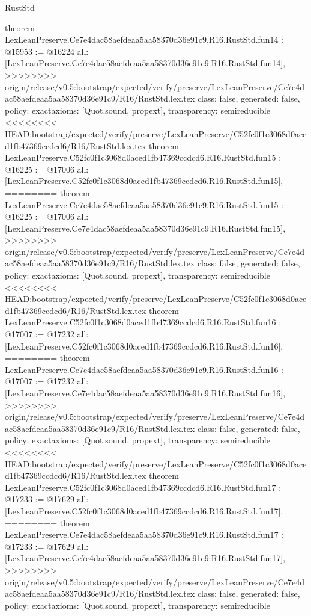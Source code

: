 \begin{lexlean}{RustStd}
\begin{coremodule}
{\begin{coremodule}
{{{{{{{{{{{{{{{{{theorem LexLeanPreserve.Ce7e4dac58aefdeaa5aa58370d36e91c9.R16.RustStd.fun14 : @15953 := @16224 {
  all: [LexLeanPreserve.Ce7e4dac58aefdeaa5aa58370d36e91c9.R16.RustStd.fun14],
>>>>>>>> origin/release/v0.5:bootstrap/expected/verify/preserve/LexLeanPreserve/Ce7e4dac58aefdeaa5aa58370d36e91c9/R16/RustStd.lex.tex
  class: false,
  generated: false,
  policy: exact{axioms: [Quot.sound, propext]},
  transparency: semireducible
}
<<<<<<<< HEAD:bootstrap/expected/verify/preserve/LexLeanPreserve/C52fc0f1c3068d0aced1fb47369ccdcd6/R16/RustStd.lex.tex
theorem LexLeanPreserve.C52fc0f1c3068d0aced1fb47369ccdcd6.R16.RustStd.fun15 : @16225 := @17006 {
  all: [LexLeanPreserve.C52fc0f1c3068d0aced1fb47369ccdcd6.R16.RustStd.fun15],
========
theorem LexLeanPreserve.Ce7e4dac58aefdeaa5aa58370d36e91c9.R16.RustStd.fun15 : @16225 := @17006 {
  all: [LexLeanPreserve.Ce7e4dac58aefdeaa5aa58370d36e91c9.R16.RustStd.fun15],
>>>>>>>> origin/release/v0.5:bootstrap/expected/verify/preserve/LexLeanPreserve/Ce7e4dac58aefdeaa5aa58370d36e91c9/R16/RustStd.lex.tex
  class: false,
  generated: false,
  policy: exact{axioms: [Quot.sound, propext]},
  transparency: semireducible
}
<<<<<<<< HEAD:bootstrap/expected/verify/preserve/LexLeanPreserve/C52fc0f1c3068d0aced1fb47369ccdcd6/R16/RustStd.lex.tex
theorem LexLeanPreserve.C52fc0f1c3068d0aced1fb47369ccdcd6.R16.RustStd.fun16 : @17007 := @17232 {
  all: [LexLeanPreserve.C52fc0f1c3068d0aced1fb47369ccdcd6.R16.RustStd.fun16],
========
theorem LexLeanPreserve.Ce7e4dac58aefdeaa5aa58370d36e91c9.R16.RustStd.fun16 : @17007 := @17232 {
  all: [LexLeanPreserve.Ce7e4dac58aefdeaa5aa58370d36e91c9.R16.RustStd.fun16],
>>>>>>>> origin/release/v0.5:bootstrap/expected/verify/preserve/LexLeanPreserve/Ce7e4dac58aefdeaa5aa58370d36e91c9/R16/RustStd.lex.tex
  class: false,
  generated: false,
  policy: exact{axioms: [Quot.sound, propext]},
  transparency: semireducible
}
<<<<<<<< HEAD:bootstrap/expected/verify/preserve/LexLeanPreserve/C52fc0f1c3068d0aced1fb47369ccdcd6/R16/RustStd.lex.tex
theorem LexLeanPreserve.C52fc0f1c3068d0aced1fb47369ccdcd6.R16.RustStd.fun17 : @17233 := @17629 {
  all: [LexLeanPreserve.C52fc0f1c3068d0aced1fb47369ccdcd6.R16.RustStd.fun17],
========
theorem LexLeanPreserve.Ce7e4dac58aefdeaa5aa58370d36e91c9.R16.RustStd.fun17 : @17233 := @17629 {
  all: [LexLeanPreserve.Ce7e4dac58aefdeaa5aa58370d36e91c9.R16.RustStd.fun17],
>>>>>>>> origin/release/v0.5:bootstrap/expected/verify/preserve/LexLeanPreserve/Ce7e4dac58aefdeaa5aa58370d36e91c9/R16/RustStd.lex.tex
  class: false,
  generated: false,
  policy: exact{axioms: [Quot.sound, propext]},
  transparency: semireducible
}}}}}}}}}}}}}}}}}}}}}
\end{coremodule}}
\end{coremodule}
\end{lexlean}

